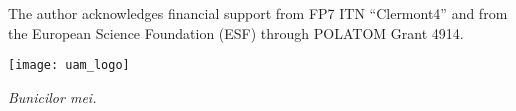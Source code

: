 \noindent
The author acknowledges financial support from FP7 ITN ``Clermont4'' and
from the European Science Foundation (ESF) through POLATOM Grant 4914.
\vspace{\baselineskip}


\begin{center}
\texttt{[image: uam\_logo]}  
\end{center}


\newpage

\thispagestyle{empty}

\phantom{text}

\vspace{2cm}

\begin{flushright}
  {\em Bunicilor mei.}
\end{flushright}

\newpage

\thispagestyle{empty}

